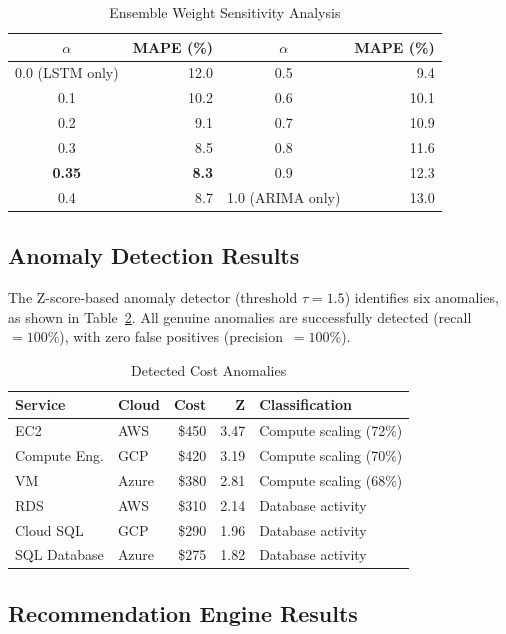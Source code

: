 \documentclass[conference]{IEEEtran}
\begin{document}
\begin{table}[htbp]
\caption{Ensemble Weight Sensitivity Analysis}
\label{tab:sensitivity}
\centering
\begin{tabular}{@{}cr|cr@{}}
\toprule
$\alpha$ & MAPE (\%) & $\alpha$ & MAPE (\%) \\
\midrule
0.0 (LSTM only) & 12.0 & 0.5 & 9.4 \\
0.1 & 10.2 & 0.6 & 10.1 \\
0.2 & 9.1 & 0.7 & 10.9 \\
0.3 & 8.5 & 0.8 & 11.6 \\
\textbf{0.35} & \textbf{8.3} & 0.9 & 12.3 \\
0.4 & 8.7 & 1.0 (ARIMA only) & 13.0 \\
\bottomrule
\end{tabular}
\end{table}

\subsection{Anomaly Detection Results}

The Z-score-based anomaly detector (threshold $\tau = 1.5$) identifies six anomalies, as shown in Table~\ref{tab:anomalies}. All genuine anomalies are successfully detected (recall~$= 100\%$), with zero false positives (precision~$= 100\%$).

\begin{table}[htbp]
\caption{Detected Cost Anomalies}
\label{tab:anomalies}
\centering
\begin{tabular}{@{}llrrp{2.5cm}@{}}
\toprule
\textbf{Service} & \textbf{Cloud} & \textbf{Cost} & \textbf{Z} & \textbf{Classification} \\
\midrule
EC2 & AWS & \$450 & 3.47 & Compute scaling (72\%) \\
Compute Eng. & GCP & \$420 & 3.19 & Compute scaling (70\%) \\
VM & Azure & \$380 & 2.81 & Compute scaling (68\%) \\
RDS & AWS & \$310 & 2.14 & Database activity \\
Cloud SQL & GCP & \$290 & 1.96 & Database activity \\
SQL Database & Azure & \$275 & 1.82 & Database activity \\
\bottomrule
\end{tabular}
\end{table}

\subsection{Recommendation Engine Results}
\end{document}
